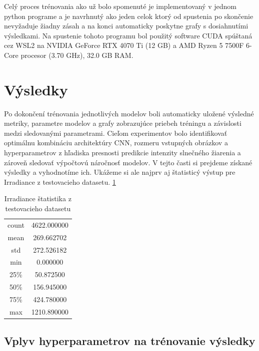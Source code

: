 Celý proces trénovania ako už bolo spomenuté je implementovaný v jednom python programe a je navrhnutý ako jeden celok ktorý od spustenia po skončenie nevyžaduje žiadny zásah a na konci automaticky poskytne grafy s dosiahnutími výsledkami. Na spustenie tohoto programu bol použitý software CUDA  spúštaná cez WSL2 na NVIDIA GeForce RTX 4070 Ti (12 GB) a AMD Ryzen 5 7500F 6-Core procesor (3.70 GHz), 32.0 GB RAM.


\section{Výsledky}

Po dokončení trénovania jednotlivých modelov boli automaticky uložené výsledné metriky, parametre modelov a grafy zobrazujúce priebeh tréningu a závislosti medzi sledovanými parametrami. Cieľom experimentov bolo identifikovať optimálnu kombináciu architektúry CNN, rozmeru vstupných obrázkov a hyperparametrov z hľadiska presnosti predikcie intenzity slnečného žiarenia a zároveň sledovať výpočtovú náročnosť modelov. V tejto časti si prejdeme získané výsledky a vyhodnotíme ich. Ukážeme si ale najprv aj štatisticý výstup pre  Irradiance z testovacieho datasetu. \ref{tab:Irradiance_statistics}
\begin{table}
\caption{Irradiance štatistika z testovacieho datasetu}
\label{tab:Irradiance_statistics}
\begin{tabular}{ | c  c|}
\hline
count    &4622.000000 \\
mean      &269.662702 \\
std       &272.526182\\
min         &0.000000\\
25\%        &50.872500\\
50\%       &156.945000\\
75\%       &424.780000\\
max      &1210.890000\\
\hline
\end{tabular}
\end{table}



\subsection{Vplyv hyperparametrov na trénovanie výsledky}

